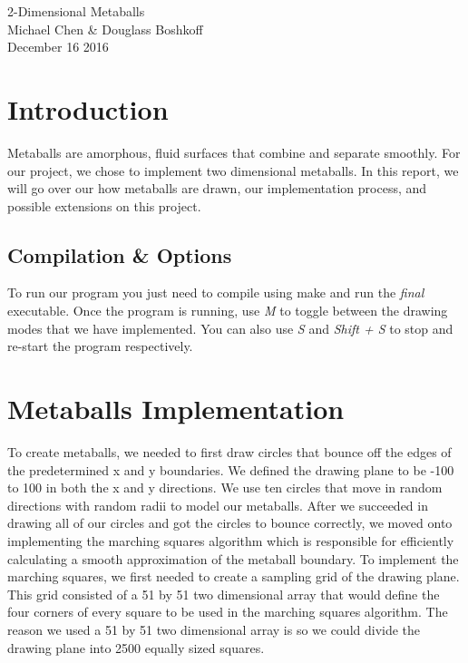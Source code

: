 \documentclass{article}
\begin{document}
\begin{center}
\huge{{2-Dimensional Metaballs}}\\
\huge{{Michael Chen \& Douglass Boshkoff}}\\
\huge{{December 16 2016}}
\end{center}

\section*{Introduction}

Metaballs are amorphous, fluid surfaces that combine and separate smoothly. For our project, we chose to implement two dimensional metaballs. In this report, we will go over our how metaballs are drawn, our implementation process, and possible extensions on this project. 

\subsection*{Compilation \& Options}

To run our program you just need to compile using make and run the \emph{final} executable. Once the program is running, use \emph{M} to toggle between the drawing modes  that we have implemented. You can also use \emph{S} and \emph{Shift + S} to stop and re-start the program respectively.

\section*{Metaballs Implementation}

To create metaballs, we needed to first draw circles that bounce off the edges of the predetermined x and y boundaries. We defined the drawing plane to be -100 to 100 in both the x and y directions. We use ten circles that move in random directions with random radii to model our metaballs. After we succeeded in drawing all of our circles and got the circles to bounce correctly, we moved onto implementing the marching squares algorithm which is responsible for efficiently calculating a smooth approximation of the metaball boundary. To implement the marching squares, we first needed to create a sampling grid of the drawing plane. This grid consisted of a 51 by 51 two dimensional array that would define the four corners of every square to be used in the marching squares algorithm. The reason we used a 51 by 51 two dimensional array is so we could divide the drawing plane into 2500 equally sized squares. 
\end{document}
